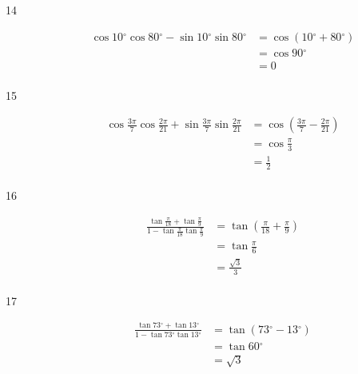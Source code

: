 \documentclass{exam}
\newcommand{\dg}{\ensuremath{^\circ}}
\begin{document}
\begin{description}
      \item[14] 
        \begin{align*}
          \cos 10 \dg \cos 80 \dg - \sin 10 \dg \sin 80 \dg & = \cos (10 \dg + 80 \dg) \\
                                                            & = \cos 90 \dg \\
                                                            & = \boxed{ 0 } \\
        \end{align*}

      \item[15] 
        \begin{align*}
          \cos \frac{3 \pi}{7}  \cos \frac{2 \pi}{21}  + \sin \frac{3 \pi}{7}  \sin \frac{2 \pi}{21} 
            & = \cos \left( \frac{3 \pi}{7}  - \frac{2 \pi}{21} \right) \\
            & = \cos \frac{\pi}{3} \\
            & = \boxed{ \frac{1}{2} } \\
        \end{align*}

      \item[16] 
        \begin{align*}
          \frac{\tan \frac{\pi}{18} + \tan \frac{\pi}{9}}{1 - \tan \frac{\pi}{18} \tan \frac{\pi}{9}} 
            &= \tan \left( \frac{\pi}{18} + \frac{\pi}{9} \right) \\
            &= \tan \frac{\pi}{6} \\
            &= \boxed{ \frac{\sqrt{3}}{3} } \\
        \end{align*}

      \item[17] 
        \begin{align*}
          \frac{\tan 73 \dg + \tan 13 \dg}{1 - \tan 73 \dg \tan 13 \dg} 
            &= \tan (73 \dg - 13 \dg) \\
            &= \tan 60 \dg \\
            &= \boxed{ \sqrt{3} } \\
        \end{align*}
        

\end{description}
\end{document}
